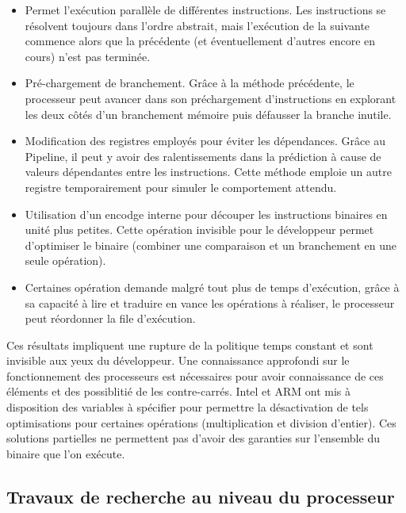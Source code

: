 \begin{itemize}
    \item[\textbf{Pipeline}] Permet l'exécution parallèle de différentes instructions. Les instructions se résolvent toujours dans l'ordre abstrait, mais l’exécution de la suivante commence alors que la précédente (et éventuellement d’autres encore en cours) n’est pas terminée.
    \item[\textbf{Prédiction de branche}] Pré-chargement de branchement. Grâce à la méthode précédente, le processeur peut avancer dans son préchargement d'instructions en explorant les deux côtés d'un branchement mémoire puis défausser la branche inutile.
    \item[\textbf{Renommage de registres}] Modification des registres employés pour éviter les dépendances. Grâce au Pipeline, il peut y avoir des ralentissements dans la prédiction à cause de valeurs dépendantes entre les instructions. Cette méthode emploie un autre registre temporairement pour simuler le comportement attendu.
    \item[\textbf{Micro-opérations}] Utilisation d'un encodge interne pour découper les instructions binaires en unité plus petites. Cette opération invisible pour le développeur permet d'optimiser le binaire (\eg combiner une comparaison et un branchement en une seule opération).
    \item[\textbf{Exécution désordonné}\footnote{Plus connus sous le terme technique de référence anglais : Out-of-order Execution}] Certaines opération demande malgré tout plus de temps d'exécution, grâce à sa capacité à lire et traduire en vance les opérations à réaliser, le processeur peut réordonner la file d'exécution.
\end{itemize}\medbreak

Ces résultats impliquent une rupture de la politique temps constant et sont invisible aux yeux du développeur. Une connaissance approfondi sur le fonctionnement des processeurs est nécessaires pour avoir connaissance de ces éléments et des possiblitié de les contre-carrés. Intel et ARM ont mis à disposition des variables à spécifier pour permettre la désactivation de tels optimisations pour certaines opérations (multiplication et division d'entier). Ces solutions partielles ne permettent pas d'avoir des garanties sur l'ensemble du binaire que l'on exécute.

\subsection*{Travaux de recherche au niveau du processeur}

